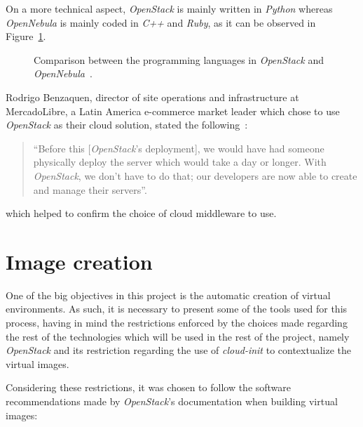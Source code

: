 On a more technical aspect, \textit{OpenStack} is mainly written in \textit{Python} whereas \textit{OpenNebula} is mainly coded in \textit{C++} and \textit{Ruby}, as it can be observed in Figure~\ref{fig:code-stack-nebula}.

\begin{figure}[h!]
  \begin{center}
    \leavevmode
    \caption{Comparison between the programming languages in \textit{OpenStack} and \textit{OpenNebula}~\cite{ohloh}.}
    \label{fig:code-stack-nebula}
  \end{center}
\end{figure}

Rodrigo Benzaquen, director of site operations and infrastructure at MercadoLibre, a Latin America e-commerce market leader which chose to use \textit{OpenStack} as their cloud solution, stated the following~\cite{openstack-userstories}:

\begin{quote}
 ``Before this [\textit{OpenStack}'s deployment], we would have had someone physically deploy the server which would take a day or longer. With \textit{OpenStack}, we don't have to do that; our developers are now able to create and manage their servers''.
\end{quote}

which helped to confirm the choice of cloud middleware to use.


\clearpage
\section{Image creation} \label{sec:iso}

One of the big objectives in this project is the automatic creation of virtual environments. As such, it is necessary to present some of the tools used for this process, having in mind the restrictions enforced by the choices made regarding the rest of the technologies which will be used in the rest of the project, namely \textit{OpenStack} and its restriction regarding the use of \textit{cloud-init} to contextualize the virtual images.

Considering these restrictions, it was chosen to follow the software recommendations made by \textit{OpenStack}'s documentation when building virtual images:

